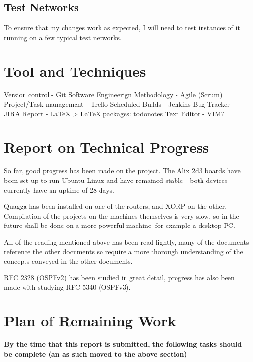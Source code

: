\documentclass[12pt]{report}
\begin{document}

\section{Test Networks}
To ensure that my changes work as expected, I will need to test instances of it
running on a few typical test networks. 


\chapter{Tool and Techniques}

Version control - Git
Software Engineerign Methodology - Agile (Scrum)
Project/Task management - Trello
Scheduled Builds - Jenkins 
Bug Tracker - JIRA 
Report - LaTeX
 > LaTeX packages: todonotes
Text Editor - VIM?

\chapter{Report on Technical Progress}

So far, good progress has been made on the project.  The Alix 2d3 boards have
been set up to run Ubuntu Linux and have remained stable - both devices
currently have an uptime of 28 days.

Quagga has been installed on one of the routers, and XORP on the other.
Compilation of the projects on the machines themselves is very slow, so in the
future shall be done on a more powerful machine, for example a desktop PC.

All of the reading mentioned above has been read lightly, many of the documents
reference the other documents so require a more thorough understanding of the
concepts conveyed in the other documents.

RFC 2328 (OSPFv2) has been studied in great detail, progress has also been made
with studying RFC 5340 (OSPFv3). 

\chapter{Plan of Remaining Work}

\em

\textbf{
	By the time that this report is submitted, the following tasks should be
	complete (an as such moved to the above section) 
}
\end{document}
